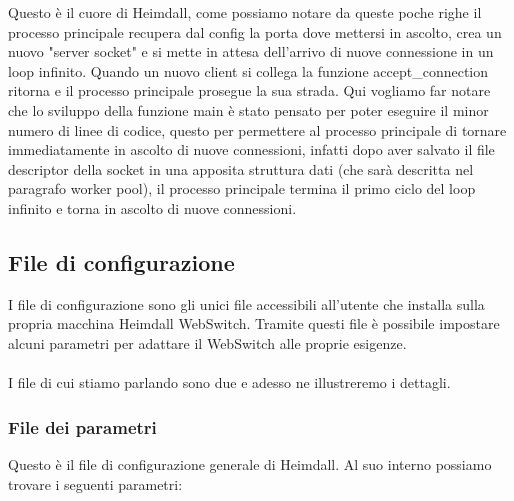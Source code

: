 \documentclass[italian]{tktltiki2}
\begin{document}
Questo è il cuore di Heimdall, come possiamo notare da queste poche righe il processo principale recupera dal config la porta dove mettersi in ascolto, crea un nuovo "server socket" e si mette in attesa dell'arrivo di nuove connessione in un loop infinito. Quando un nuovo client si collega la funzione accept\_connection ritorna e il processo principale prosegue la sua strada. Qui vogliamo far notare che lo sviluppo della funzione main è stato pensato per poter eseguire il minor numero di linee di codice, questo per permettere al processo principale di tornare immediatamente in ascolto di nuove connessioni, infatti dopo aver salvato il file descriptor della socket in una apposita struttura dati (che sarà descritta nel paragrafo worker pool), il processo principale termina il primo ciclo del loop infinito e torna in ascolto di nuove connessioni.


\subsection{File di configurazione}
\label{sec:config}
I file di configurazione sono gli unici file accessibili all'utente che installa sulla propria macchina Heimdall WebSwitch. Tramite questi file è possibile impostare alcuni parametri per adattare il WebSwitch alle proprie esigenze.\\\\
I file di cui stiamo parlando sono due e adesso ne illustreremo i dettagli.
\subsubsection{File dei parametri}
\label{sec:config_parser}
Questo è il file di configurazione generale di Heimdall. Al suo interno possiamo trovare i seguenti parametri:
\end{document}
